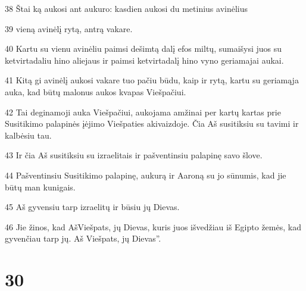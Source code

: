 \par 38 Štai ką aukosi ant aukuro: kasdien aukosi du metinius avinėlius­ 
\par 39 vieną avinėlį rytą, antrą vakare. 
\par 40 Kartu su vienu avinėliu paimsi dešimtą dalį efos miltų, sumaišysi juos su ketvirtadaliu hino aliejaus ir paimsi ketvirtadalį hino vyno geriamajai aukai. 
\par 41 Kitą gi avinėlį aukosi vakare tuo pačiu būdu, kaip ir rytą, kartu su geriamąja auka, kad būtų malonus aukos kvapas Viešpačiui. 
\par 42 Tai deginamoji auka Viešpačiui, aukojama amžinai per kartų kartas prie Susitikimo palapinės įėjimo Viešpaties akivaizdoje. Čia Aš susitiksiu su tavimi ir kalbėsiu tau. 
\par 43 Ir čia Aš susitiksiu su izraelitais ir pašventinsiu palapinę savo šlove. 
\par 44 Pašventinsiu Susitikimo palapinę, aukurą ir Aaroną su jo sūnumis, kad jie būtų man kunigais. 
\par 45 Aš gyvensiu tarp izraelitų ir būsiu jų Dievas. 
\par 46 Jie žinos, kad Aš­Viešpats, jų Dievas, kuris juos išvedžiau iš Egipto žemės, kad gyvenčiau tarp jų. Aš Viešpats, jų Dievas”.



\chapter{30}


